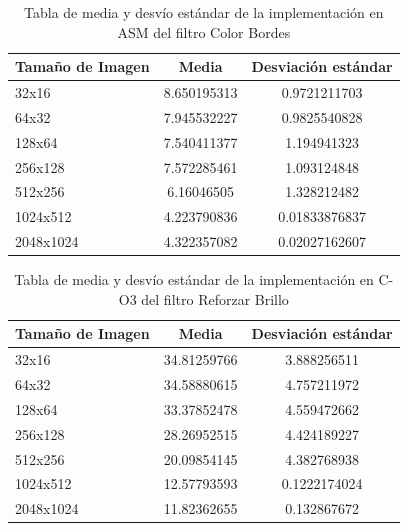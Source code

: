 \documentclass[a4paper]{article}
\begin{document}
\begin{table}[h!]
	\begin{center}
		\begin{tabular}{| l | c | c |}
			\hline
			Tamaño de Imagen & Media & Desviación estándar \\ \hline
			32x16	& 8.650195313	& 0.9721211703 \\
			64x32	& 7.945532227	& 0.9825540828 \\
			128x64	& 7.540411377	& 1.194941323 \\
			256x128	& 7.572285461	& 1.093124848 \\
			512x256	& 6.16046505	& 1.328212482 \\
			1024x512 & 4.223790836	& 0.01833876837 \\
			2048x1024 &4.322357082	& 0.02027162607 \\ \hline
		\end{tabular}
		\caption{Tabla de media y desvío estándar de la implementación en ASM del filtro Color Bordes}
	\end{center}
\end{table}
\newpage
\begin{table}[h!]
	\begin{center}
		\begin{tabular}{| l | c | c |}
			\hline
			Tamaño de Imagen & Media & Desviación estándar \\ \hline
			32x16	& 34.81259766	& 3.888256511 \\
			64x32	& 34.58880615	& 4.757211972 \\
			128x64	& 33.37852478	& 4.559472662 \\
			256x128	& 28.26952515	& 4.424189227 \\
			512x256	& 20.09854145	& 4.382768938 \\
			1024x512 & 12.57793593	& 0.1222174024 \\
			2048x1024 & 11.82362655	& 0.132867672 \\ \hline 
		\end{tabular}
		\caption{Tabla de media y desvío estándar de la implementación en C-O3 del filtro Reforzar Brillo}
	\end{center}
\end{table}
\end{document}
